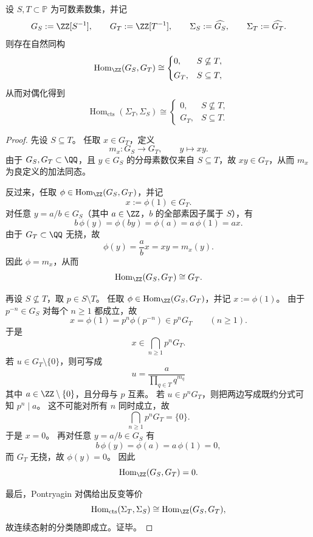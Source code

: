\begin{theorem}\label{thm:xi-time-part60f2-countable-solenoid-morphism-classification}
设 \(S,T\subset\mathbb P\) 为可数素数集，并记
\[
G_S:=\ZZ[S^{-1}],
\qquad
G_T:=\ZZ[T^{-1}],
\qquad
\Sigma_S:=\widehat{G_S},
\qquad
\Sigma_T:=\widehat{G_T}.
\]
则存在自然同构
\[
\operatorname{Hom}_{\ZZ}(G_S,G_T)\cong
\begin{cases}
0,& S\not\subseteq T,\\[1mm]
G_T,& S\subseteq T,
\end{cases}
\]
从而对偶化得到
\[
\operatorname{Hom}_{\mathrm{cts}}(\Sigma_T,\Sigma_S)\cong
\begin{cases}
0,& S\not\subseteq T,\\[1mm]
G_T,& S\subseteq T.
\end{cases}
\]
\end{theorem}
\begin{proof}
先设 \(S\subseteq T\)。
任取 \(x\in G_T\)，定义
\[
m_x:G_S\to G_T,
\qquad
y\mapsto xy.
\]
由于 \(G_S,G_T\subset\QQ\)，且 \(y\in G_S\) 的分母素数仅来自 \(S\subseteq T\)，故 \(xy\in G_T\)，从而 \(m_x\) 为良定义的加法同态。

反过来，任取 \(\phi\in \operatorname{Hom}_{\ZZ}(G_S,G_T)\)，并记
\[
x:=\phi(1)\in G_T.
\]
对任意 \(y=a/b\in G_S\)（其中 \(a\in\ZZ\)，\(b\) 的全部素因子属于 \(S\)），有
\[
b\,\phi(y)=\phi(by)=\phi(a)=a\,\phi(1)=ax.
\]
由于 \(G_T\subset\QQ\) 无挠，故
\[
\phi(y)=\frac{a}{b}x=xy=m_x(y).
\]
因此 \(\phi=m_x\)，从而
\[
\operatorname{Hom}_{\ZZ}(G_S,G_T)\cong G_T.
\]

再设 \(S\not\subseteq T\)，取 \(p\in S\setminus T\)。
任取 \(\phi\in\operatorname{Hom}_{\ZZ}(G_S,G_T)\)，并记 \(x:=\phi(1)\)。
由于 \(p^{-n}\in G_S\) 对每个 \(n\ge 1\) 都成立，故
\[
x=\phi(1)=p^n\phi(p^{-n})\in p^nG_T
\qquad(n\ge 1).
\]
于是
\[
x\in \bigcap_{n\ge 1}p^nG_T.
\]
若 \(u\in G_T\setminus\{0\}\)，则可写成
\[
u=\frac{a}{\prod_{q\in T}q^{m_q}}
\]
其中 \(a\in\ZZ\setminus\{0\}\)，且分母与 \(p\) 互素。
若 \(u\in p^nG_T\)，则把两边写成既约分式可知 \(p^n\mid a\)。
这不可能对所有 \(n\) 同时成立，故
\[
\bigcap_{n\ge 1}p^nG_T=\{0\}.
\]
于是 \(x=0\)。
再对任意 \(y=a/b\in G_S\) 有
\[
b\,\phi(y)=\phi(a)=a\,\phi(1)=0,
\]
而 \(G_T\) 无挠，故 \(\phi(y)=0\)。
因此
\[
\operatorname{Hom}_{\ZZ}(G_S,G_T)=0.
\]

最后，Pontryagin 对偶给出反变等价
\[
\operatorname{Hom}_{\mathrm{cts}}(\Sigma_T,\Sigma_S)\cong \operatorname{Hom}_{\ZZ}(G_S,G_T),
\]
故连续态射的分类随即成立。证毕。
\end{proof}


